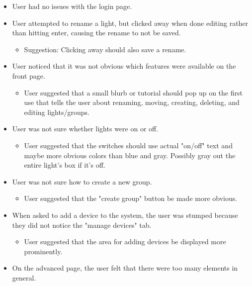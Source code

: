 \documentclass[oneside,openright]{book}
\begin{document}
\begin{itemize}
    \item User had no issues with the login page.
    \item User attempted to rename a light, but clicked away when done editing
        rather than hitting enter, causing the rename to not be saved.
        \begin{itemize}
            \item Suggestion: Clicking away should also save a rename.
        \end{itemize}
    \item User noticed that it was not obvious which features were available on
        the front page.
        \begin{itemize}
            \item User suggested that a small blurb or tutorial should pop up
                on the first use that tells the user about renaming, moving,
                creating, deleting, and editing lights/groups.
        \end{itemize}
    \item User was not sure whether lights were on or off.
        \begin{itemize}
            \item User suggested that the switches should use actual "on/off"
                text and maybe more obvious colors than blue and gray.
                Possibly gray out the entire light's box if it's off.
        \end{itemize}
    \item User was not sure how to create a new group.
        \begin{itemize}
            \item User suggested that the "create group" button be made more
                obvious.
        \end{itemize}
    \item When asked to add a device to the system, the user was stumped
        because they did not notice the "manage devices" tab.
        \begin{itemize}
            \item User suggested that the area for adding devices be displayed
                more prominently.
        \end{itemize}
    \item On the advanced page, the user felt that there were too many elements
        in general.
        \begin{itemize}

\end{itemize}
\end{itemize}
\end{document}
